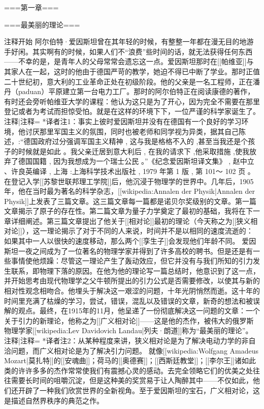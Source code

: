 \documentclass[12pt,a4paper,twoside]{ctexrep}
\begin{document}
===第一章===

===最美丽的理论===

{{注释开始}}
    阿尔伯特·爱因斯坦曾在其年轻的时候，有整整一年都在漫无目的地游手好闲。其实啊有的时候，如果人们不“浪费”些时间的话，就无法获得任何东西——不幸的是，是青年人的父母常常会遗忘这一点。爱因斯坦那时在[[帕维亚]]与其家人在一起，这时的他由于德国严苛的教学，她迫不得已中断了学业。那时正值二十世纪初，意大利的工业革命正处在初级阶段。他的父亲是一名工程师，正在潘丹（paduan）平原建立第一台电力工厂。那时的阿尔伯特正在阅读康德的著作，有时还会旁听帕维亚大学的课程：他认为这只是为了开心，因为完全不需要在那里登记或者为考试而担惊受怕。就是在这样的环境下下，一位严谨的科学家诞生了。
{{注释|注释=
*译者注1：事实上彼时爱因斯坦并没有在德国有一个良好的学习环境，他讨厌那里军国主义的氛围，同时也被老师和同学视为异类，据其自己陈述，:“德国政府过分强调军国主义精神 , 这与我是格格不入的 ,甚至当我还是个孩子的时候就是如此 。我父亲迁居到意大利后 , 在我的请求下 ,他采取措施 ,使我放弃了德国国籍 , 因为我想成为一个瑞士公民 。”《纪念爱因斯坦译文集》 , 赵中立 、许良英编译 , 上海 :上海科学技术出版社 , 1979 年第 1 版 , 第 101～ 102 页 。
}}
    在登记入学[[苏黎世联邦理工学院]]后，他沉浸于物理学的世界中。几年后，1905年，他在当时最为著名的科学杂志，[[wikipedia:Annalen der Physik|Annalen der Physik]]上发表了三篇文章。这三篇文章每一篇都是诺贝尔奖级别的文章。第一篇文章揭示了原子的存在性。第二篇文章为量子力学奠定了最初的基础，我将在下一章详细阐述。第三篇文章提出了他关于[[相对论]]最初的理论（今天称之为[[狭义相对论]]），这一理论揭示了对于不同的人来说，时间并不是以相同的速度流逝的：如果其中一人以很快的速度移动，那么两个[[孪生子]]会发现他们年龄不同。
    爱因斯坦一夜之间成为了一位著名的物理学家并得到了许多高校的聘书。但是还是有一些事情使他烦躁：尽管这一理论产生了轰动效应，但它并没有与我们所知的引力发生联系，即物理下落的原因。在他为他的理论写一篇总结时，他意识到了这一点，并开始思考由现代物理学之父牛顿所提出的引力公式是否需要修改，以使其与新的相对性观念相吻合。他埋头于解决这一艰涩的问题，十年光阴悄然而逝。这十年的时间里充满了枯燥的学习，尝试，错误，混乱以及错误的文章，新奇的想法和被误解的观点。最终，在1915年的11月，他呈递了一份彻底解决这一问题的文章：一个关于引力的新理论，他称之为[[广义相对论]]——这是他的杰作，被伟大的俄罗斯物理学家[[wikipedia:Lev Davidovich Landau|列夫·朗道]]称为“最美丽的理论”。
{{注释|注释=
*译者注2：从某种程度来讲，狭义相对论是为了解决电动力学的非自洽问题，而广义相对论是为了解决引力问题。
}}
    就像[[wikipedia:Wolfgang Amadeus Mozart|莫扎特]]的[[安魂曲]]；荷马的[[奥德赛]]；[[西斯廷教堂]]；[[李尔王]]诸如此类的许许多多的杰作常常使我们有震撼心灵的感动。去完全领略它们的优美之处往往需要长时间的咀嚼沉淀，但是这种美的奖赏易于让人陶醉其中——不仅如此，他们还开辟了一种我们欣赏世界的全新视角。至于爱因斯坦的宝石，广义相对论，这是描述自然界秩序的典范之作。
\end{document}
